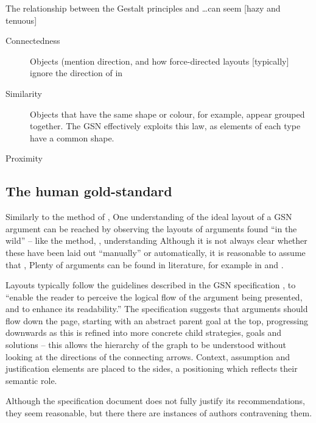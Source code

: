The relationship between the Gestalt principles and \ldots can seem [hazy and tenuous]

\begin{description}
    \item[Connectedness] Objects (mention direction, and how force-directed layouts [typically] ignore the direction of in

    \item[Similarity] Objects that have the same shape or colour, for example, appear grouped together.
    The GSN effectively exploits this law, as elements of each type have a common shape.
    
    \item[Proximity]
    
\end{description}



\subsection{The human gold-standard}

Similarly to the method of \citet{5674033}, One understanding of the ideal layout of a GSN argument can be reached by observing the layouts of arguments found ``in the wild'' -- like the method, , understanding 
Although it is not always clear whether these have been laid out ``manually'' or automatically, it is reasonable to assume that , 
Plenty of arguments can be found in literature, for example in \cite{Habli:2006:PPC:1183088.1183090} and  \cite{insilico}.

Layouts typically follow the guidelines described in the GSN specification \citep[section~2.2, pp.~26--27]{gsnstandard}, 
to ``enable the reader to perceive the logical flow of the argument being presented, and to enhance its readability.''
The specification suggests that arguments should flow down the page, starting with an abstract parent goal at the top, progressing downwards as this is refined into more concrete child strategies, goals and solutions -- this allows the hierarchy of the graph to be understood without looking at the directions of the connecting arrows.
Context, assumption and justification elements are placed to the sides, a positioning which reflects their semantic role.

Although the specification document does not fully justify its recommendations, they seem reasonable, but there there are instances of authors contravening them.

